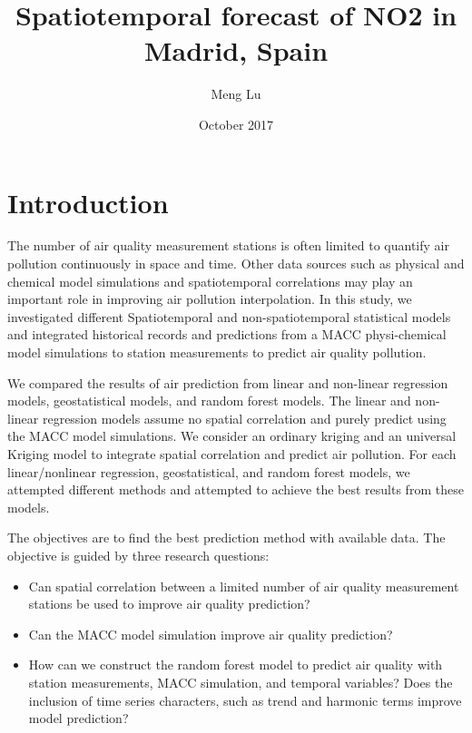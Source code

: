 \documentclass{article}
\title{Spatiotemporal forecast of NO2 in Madrid, Spain}
\author{Meng Lu}
\date{October 2017}
\begin{document}
\maketitle

\section{Introduction}

The number of air quality measurement stations is often limited to quantify air pollution continuously in space and time. Other data sources such as physical and chemical model simulations and spatiotemporal correlations may play an important role in improving air pollution interpolation. In this study, we investigated different Spatiotemporal and non-spatiotemporal statistical models and integrated historical records and predictions from a MACC physi-chemical model simulations to station measurements to predict air quality pollution.

We compared the results of air prediction from linear and non-linear regression models, geostatistical models, and random forest models. The linear and non-linear regression models assume no spatial correlation and purely predict using the MACC model simulations. We consider an ordinary kriging and an universal Kriging model to integrate spatial correlation and predict air pollution. For each linear/nonlinear regression, geostatistical, and random forest models, we attempted different methods and attempted to achieve the best results from these models.    

The objectives are to find the best prediction method with available data. The objective is guided by three research questions:

\begin{itemize}
\item Can spatial correlation between a limited number of air quality measurement stations be used to improve air quality prediction? 

\item Can the MACC model simulation improve air quality prediction?

\item How can we construct the random forest model to predict air quality with station measurements, MACC simulation, and temporal variables? Does the inclusion of time series characters, such as trend and harmonic terms improve model prediction? 

\end{itemize}
\end{document}
